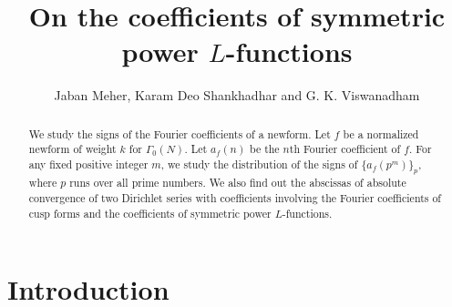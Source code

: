 \documentclass[12pt,a4paper,reqno]{amsart}
\begin{document}
\title
{On the coefficients of symmetric power $L$-functions}
\author{Jaban Meher, Karam Deo Shankhadhar and G. K. Viswanadham}

\address[Jaban Meher]{School of Mathematical Sciences, National Institute of Science Education and Research, HBNI, Bhubaneswar, Via-Jatni, Khurda 752 050, Odisha, India.}

\address[Karam Deo Shankhadhar]{Department of Mathematics, Indian Institute of Science Education and Research Bhopal, Bhopal Bypass Road, Bhauri, Bhopal 462 066, Madhya Pradesh, India.}

\address[G. K. Viswanadham]{The Institute of Mathematical Sciences, HBNI,
C.I.T. Campus, Taramani, Chennai 600 113, Tamilnadu, India.}



\begin{abstract}
We study the signs of the Fourier coefficients of a newform. Let $f$ be a normalized newform of weight $k$ for $\Gamma_0(N)$. Let $a_f(n)$ be the $n$th Fourier coefficient of $f$. For any fixed positive integer $m$, we study the distribution of the signs of $\{a_f(p^m)\}_p$, where $p$ runs over all prime numbers. We also find out the abscissas of absolute convergence of two Dirichlet series with coefficients involving the Fourier coefficients of cusp forms and the coefficients of symmetric power 
$L$-functions. 

\end{abstract}

\maketitle

\section{Introduction}
\end{document}
